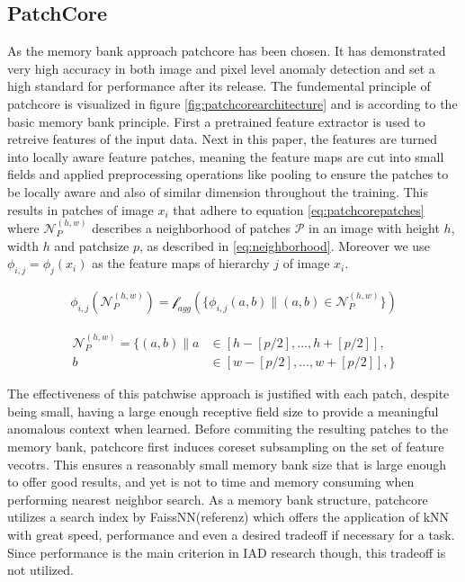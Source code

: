 \subsection{PatchCore}
\label{subsec:patchcore}
As the memory bank approach patchcore \cite{patchCore2022} has been chosen. It has demonstrated very high accuracy in both image and pixel level anomaly detection and set a high standard for 
performance after its release. The fundemental principle of patchcore is visualized in figure \ref{fig:patchcorearchitecture} and is according to the basic memory bank principle. First a pretrained feature extractor is used 
to retreive features of the input data. Next in this paper, the features are turned into locally aware feature patches, meaning the feature maps are cut into small fields and applied preprocessing operations like pooling to ensure 
the patches to be locally aware and also of similar dimension throughout the training. This results in patches of image $x_i$ that adhere to equation \ref{eq:patchcorepatches} where $\mathcal{N}_{P}^{(h,w)}$ 
describes a neighborhood of patches $\mathcal{P}$ in an image with height $h$, width $h$ and patchsize $p$, as described in \ref{eq:neighborhood}. Moreover we use $\phi_{i,j} = \phi_j(x_i)$ as the feature 
maps of hierarchy $j$ of image $x_i$.

\begin{equation}
    \label{eq:patchcorepatches}
    \begin{split}
    \phi_{i,j} (\mathcal{N}_{P}^{(h,w)}) = \mathcal{f}_{agg}(\{ \phi_{i,j}(a,b) \| (a,b) \in \mathcal{N}_{P}^{(h,w)} \})
    \end{split}
\end{equation}

\begin{equation}
    \label{eq:neighborhood}
    \begin{split}
    \mathcal{N}_{P}^{(h,w)} = \{ (a,b) \| a & \in [h - [p/2], ..., h + [p/2]], \\
                                              b & \in [w - [p/2], ..., w + [p/2]], \}
    \end{split}
\end{equation}

The effectiveness of this patchwise approach is justified with each patch, despite being small, having a large enough receptive field size to provide a meaningful anomalous context when learned. 
Before commiting the resulting patches to the memory bank, patchcore first induces coreset subsampling on the set of feature vecotrs. This ensures a reasonably small memory bank size that is 
large enough to offer good results, and yet is not to time and memory consuming when performing nearest neighbor search. As a memory bank structure, patchcore utilizes a search index by FaissNN(referenz) 
which offers the application of kNN with great speed, performance and even a desired tradeoff if necessary for a task. Since performance is the main criterion in IAD research though, this tradeoff is not 
utilized. 

